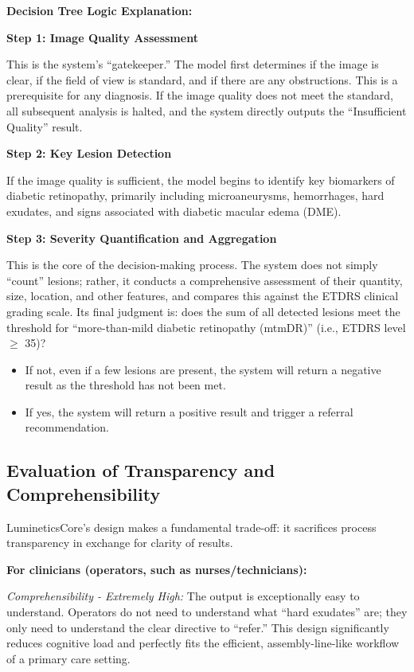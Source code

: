 \documentclass[sigplan,screen]{acmart}
\begin{document}
\textbf{Decision Tree Logic Explanation:}

\textbf{Step 1: Image Quality Assessment}

This is the system's ``gatekeeper.'' The model first determines if the image is clear, if the field of view is standard, and if there are any obstructions. This is a prerequisite for any diagnosis. If the image quality does not meet the standard, all subsequent analysis is halted, and the system directly outputs the ``Insufficient Quality'' result.

\textbf{Step 2: Key Lesion Detection}

If the image quality is sufficient, the model begins to identify key biomarkers of diabetic retinopathy, primarily including microaneurysms, hemorrhages, hard exudates, and signs associated with diabetic macular edema (DME).

\textbf{Step 3: Severity Quantification and Aggregation}

This is the core of the decision-making process. The system does not simply ``count'' lesions; rather, it conducts a comprehensive assessment of their quantity, size, location, and other features, and compares this against the ETDRS clinical grading scale. Its final judgment is: does the sum of all detected lesions meet the threshold for ``more-than-mild diabetic retinopathy (mtmDR)'' (i.e., ETDRS level $\geq$ 35)?

\begin{itemize}
\item If not, even if a few lesions are present, the system will return a negative result as the threshold has not been met.
\item If yes, the system will return a positive result and trigger a referral recommendation.
    \end{itemize}
    
\subsection{Evaluation of Transparency and Comprehensibility}

LumineticsCore's design makes a fundamental trade-off: it sacrifices process transparency in exchange for clarity of results.

\textbf{For clinicians (operators, such as nurses/technicians):}

\textit{Comprehensibility - Extremely High:} The output is exceptionally easy to understand. Operators do not need to understand what ``hard exudates'' are; they only need to understand the clear directive to ``refer.'' This design significantly reduces cognitive load and perfectly fits the efficient, assembly-line-like workflow of a primary care setting.
\end{document}
